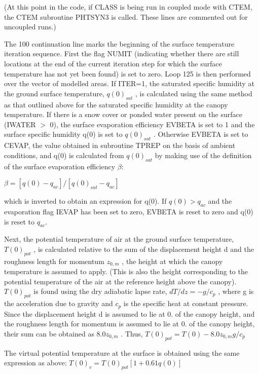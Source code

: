 (At this point in the code, if C\+L\+A\+S\+S is being run in coupled mode with C\+T\+E\+M, the C\+T\+E\+M subroutine P\+H\+T\+S\+Y\+N3 is called. These lines are commented out for uncoupled runs.)

The 100 continuation line marks the beginning of the surface temperature iteration sequence. First the flag N\+U\+M\+I\+T (indicating whether there are still locations at the end of the current iteration step for which the surface temperature has not yet been found) is set to zero. Loop 125 is then performed over the vector of modelled areas. If I\+T\+E\+R=1, the saturated specific humidity at the ground surface temperature, $q(0)_{sat}$ , is calculated using the same method as that outlined above for the saturated specific humidity at the canopy temperature. If there is a snow cover or ponded water present on the surface (I\+W\+A\+T\+E\+R $>$ 0), the surface evaporation efficiency E\+V\+B\+E\+T\+A is set to 1 and the surface specific humidity q(0) is set to $q(0)_{sat}$ . Otherwise E\+V\+B\+E\+T\+A is set to C\+E\+V\+A\+P, the value obtained in subroutine T\+P\+R\+E\+P on the basis of ambient conditions, and q(0) is calculated from $q(0)_{sat}$ by making use of the definition of the surface evaporation efficiency $\beta$\+:

$\beta = [q(0) - q_{ac} ]/[q(0)_{sat} - q_{ac} ]$

which is inverted to obtain an expression for q(0). If $q(0) > q_{ac}$ and the evaporation flag I\+E\+V\+A\+P has been set to zero, E\+V\+B\+E\+T\+A is reset to zero and q(0) is reset to $q_{ac}$.

Next, the potential temperature of air at the ground surface temperature, $T(0)_{pot}$ , is calculated relative to the sum of the displacement height d and the roughness length for momentum $z_{0,m}$ , the height at which the canopy temperature is assumed to apply. (This is also the height corresponding to the potential temperature of the air at the reference height above the canopy). $T(0)_{pot}$ is found using the dry adiabatic lapse rate, $dT/dz = -g/c_p$ , where g is the acceleration due to gravity and $c_p$ is the specific heat at constant pressure. Since the displacement height d is assumed to lie at 0. of the canopy height, and the roughness length for momentum is assumed to lie at 0. of the canopy height, their sum can be obtained as $8.0 z_{0,m}$ . Thus, $T(0)_{pot} = T(0) - 8.0 z_{0,m} g/c_p$

The virtual potential temperature at the surface is obtained using the same expression as above\+: $T(0)_v = T(0)_{pot} [1 + 0.61 q(0)]$

